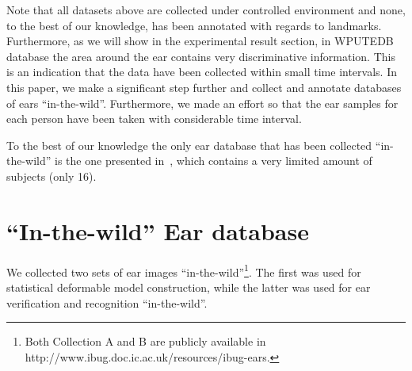 Note that all datasets above are collected under controlled environment and none, to the best of our knowledge, has been annotated with regards to landmarks. Furthermore, as we will show in the experimental result section, in WPUTEDB database the area around the ear contains very discriminative information. This is an indication that the data have been collected within small time intervals. In this paper, we make a significant step further and collect and annotate databases of ears ``in-the-wild''.  Furthermore, we made an effort so that the ear samples for each person have been taken with considerable time interval. 

To the best of our knowledge the only ear database that has been collected ``in-the-wild'' is the one presented in~\cite{emervsivc2015ear}, which contains a very limited amount of subjects (only 16).

\section{``In-the-wild'' Ear database}
\label{label:ear_db}
We collected two sets of ear images ``in-the-wild''\footnote{\label{foot:annotations_ear}Both Collection A and B are publicly available in http://www.ibug.doc.ic.ac.uk/resources/ibug-ears.}. The first was used for  statistical deformable model construction, while the latter was used for ear verification and recognition ``in-the-wild''.

